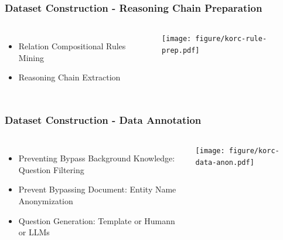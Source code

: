 \documentclass{beamer}
\begin{document}
\begin{frame}
\frametitle{Dataset Construction - Reasoning Chain Preparation}

\begin{columns}
    \begin{itemize}
        \item Relation Compositional Rules Mining
        \item Reasoning Chain Extraction
    \end{itemize}
    \begin{center}
        \texttt{[image: figure/korc-rule-prep.pdf]}
    \end{center}
\end{columns}
\end{frame}

\begin{frame}
\frametitle{Dataset Construction - Data Annotation}
\begin{columns}
    \begin{itemize}
        \item Preventing Bypass Background Knowledge: Question Filtering
        \item Prevent Bypassing Document: Entity Name Anonymization
        \item Question Generation: Template or Humann or LLMs
    \end{itemize}
    \begin{center}
        \texttt{[image: figure/korc-data-anon.pdf]}
    \end{center}
\end{columns}
\end{frame}
\end{document}
